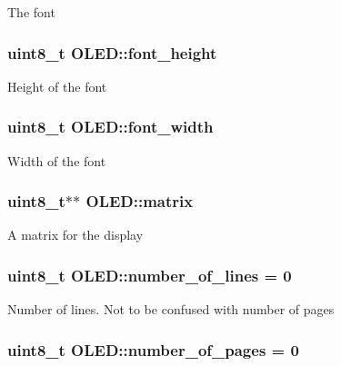 The font \hypertarget{class_o_l_e_d_a85b91421932866dea031921799ba83a3}{
\subsubsection[{font\-\_\-height}]{\setlength{\rightskip}{0pt plus 5cm}uint8\-\_\-t O\-L\-E\-D\-::font\-\_\-height\hspace{0.3cm}{\ttfamily [protected]}}}\label{class_o_l_e_d_a85b91421932866dea031921799ba83a3}
Height of the font \hypertarget{class_o_l_e_d_a3c9ea103adf6c860a2534135e9a25ba8}{
\subsubsection[{font\-\_\-width}]{\setlength{\rightskip}{0pt plus 5cm}uint8\-\_\-t O\-L\-E\-D\-::font\-\_\-width\hspace{0.3cm}{\ttfamily [protected]}}}\label{class_o_l_e_d_a3c9ea103adf6c860a2534135e9a25ba8}
Width of the font \hypertarget{class_o_l_e_d_a9d32e21189940afba24deab0a2bc0126}{
\subsubsection[{matrix}]{\setlength{\rightskip}{0pt plus 5cm}uint8\-\_\-t$\ast$$\ast$ O\-L\-E\-D\-::matrix\hspace{0.3cm}{\ttfamily [protected]}}}\label{class_o_l_e_d_a9d32e21189940afba24deab0a2bc0126}
A matrix for the display \hypertarget{class_o_l_e_d_a9ea1c55112deede1a61142af276a6bc9}{
\subsubsection[{number\-\_\-of\-\_\-lines}]{\setlength{\rightskip}{0pt plus 5cm}uint8\-\_\-t O\-L\-E\-D\-::number\-\_\-of\-\_\-lines = 0\hspace{0.3cm}{\ttfamily [protected]}}}\label{class_o_l_e_d_a9ea1c55112deede1a61142af276a6bc9}
Number of lines. Not to be confused with number of pages \hypertarget{class_o_l_e_d_aaac99b0eb4e9dfe92b8571488dc89288}{
\subsubsection[{number\-\_\-of\-\_\-pages}]{\setlength{\rightskip}{0pt plus 5cm}uint8\-\_\-t O\-L\-E\-D\-::number\-\_\-of\-\_\-pages = 0\hspace{0.3cm}{\ttfamily [protected]}}}\label{class_o_l_e_d_aaac99b0eb4e9dfe92b8571488dc89288}
